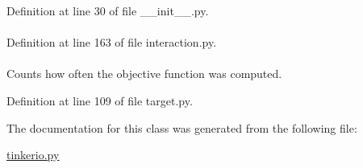 \-Definition at line 30 of file \-\_\-\-\_\-init\-\_\-\-\_\-.\-py.

\hypertarget{classforcebalance_1_1interaction_1_1Interaction_a44f014dd322e410a37dd453f99d879ba}{
\paragraph[{weight}]{}}\label{classforcebalance_1_1interaction_1_1Interaction_a44f014dd322e410a37dd453f99d879ba}


\-Definition at line 163 of file interaction.\-py.

\hypertarget{classforcebalance_1_1target_1_1Target_ad4cd0ab38d8fc97d3e7a6e22ce130a16}{
\paragraph[{xct}]{}}\label{classforcebalance_1_1target_1_1Target_ad4cd0ab38d8fc97d3e7a6e22ce130a16}


\-Counts how often the objective function was computed. 



\-Definition at line 109 of file target.\-py.



\-The documentation for this class was generated from the following file\-:\begin{DoxyCompactItemize}
\item 
\hyperlink{tinkerio_8py}{tinkerio.\-py}\end{DoxyCompactItemize}
